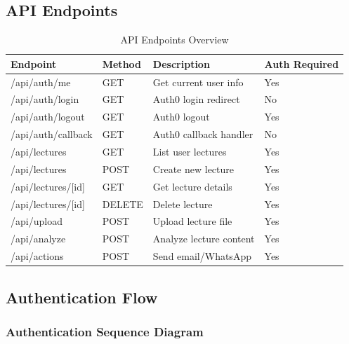 \documentclass[12pt,a4paper]{article}
\begin{document}
\subsection{API Endpoints}

\begin{table}[H]
\centering
\caption{API Endpoints Overview}
\label{tab:api-endpoints}
\begin{tabular}{@{}llll@{}}
\toprule
\textbf{Endpoint} & \textbf{Method} & \textbf{Description} & \textbf{Auth Required} \\
\midrule
/api/auth/me & GET & Get current user info & Yes \\
/api/auth/login & GET & Auth0 login redirect & No \\
/api/auth/logout & GET & Auth0 logout & Yes \\
/api/auth/callback & GET & Auth0 callback handler & No \\
\midrule
/api/lectures & GET & List user lectures & Yes \\
/api/lectures & POST & Create new lecture & Yes \\
/api/lectures/[id] & GET & Get lecture details & Yes \\
/api/lectures/[id] & DELETE & Delete lecture & Yes \\
\midrule
/api/upload & POST & Upload lecture file & Yes \\
/api/analyze & POST & Analyze lecture content & Yes \\
/api/actions & POST & Send email/WhatsApp & Yes \\
\bottomrule
\end{tabular}
\end{table}

\subsection{Authentication Flow}

\subsubsection{Authentication Sequence Diagram}
\end{document}
